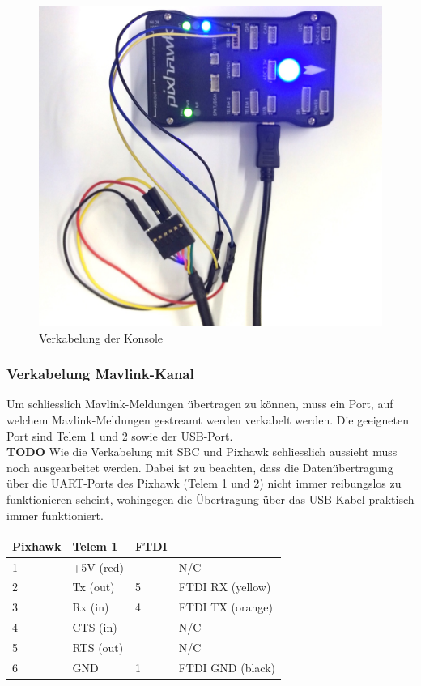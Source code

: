 \documentclass[12pt]{article} %
\begin{document}
	\begin{figure}[H]
		\centering
		\includegraphics[scale=0.3]{Verkabelung_Mav}
		\caption{Verkabelung der Konsole}
		\label{2}
	\end{figure}

\subsubsection{Verkabelung Mavlink-Kanal}
	
	\noindent Um schliesslich Mavlink-Meldungen übertragen zu können, muss ein Port, auf welchem Mavlink-Meldungen gestreamt werden verkabelt werden. Die geeigneten Port sind Telem 1 und 2 sowie der USB-Port.	\\
	\textbf{TODO} Wie die Verkabelung mit SBC und Pixhawk schliesslich aussieht muss noch ausgearbeitet werden. Dabei ist zu beachten, dass die Datenübertragung über die UART-Ports des Pixhawk (Telem 1 und 2) nicht immer reibungslos zu funktionieren scheint, wohingegen die Übertragung über das USB-Kabel praktisch immer funktioniert.
	
	\begin{description}
		\item
		\begin{tabular}{p{2cm}p{4cm}p{2cm}p{4cm}}
			\centering 
			\textbf{ Pixhawk} & \textbf{Telem 1}& \textbf{FTDI}& \\ \hline
			1 & +5V (red)	& 		& N/C				\\ \hline
			2 & Tx (out)	& 5		& FTDI RX (yellow)				\\ \hline
			3 & Rx (in)		& 4		& FTDI TX (orange)				\\ \hline
			4 & CTS (in)	& 		& N/C	\\ \hline
			5 & RTS (out)	& 		& N/C	\\ \hline
			6 & GND			& 1		& FTDI GND (black)	\\ \hline
			
		\end{tabular}
	\end{description}
	
\end{document}
